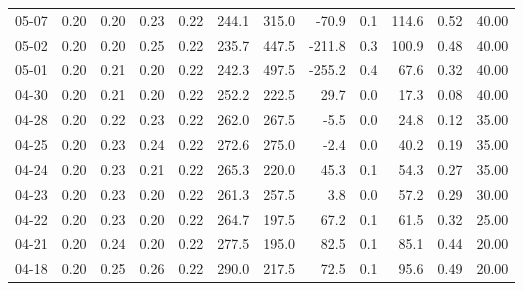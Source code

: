 \begin{threeparttable}
{\begin{tabular}{lrrrrrrrrrrr}
  05-07 &          0.20 &          0.20 &          0.23 &        0.22 &               244.1 &               315.0 &      -70.9 &                 0.1 &            114.6 &            0.52 &                  40.00 \\
  05-02 &          0.20 &          0.20 &          0.25 &        0.22 &               235.7 &               447.5 &     -211.8 &                 0.3 &            100.9 &            0.48 &                  40.00 \\
  05-01 &          0.20 &          0.21 &          0.20 &        0.22 &               242.3 &               497.5 &     -255.2 &                 0.4 &             67.6 &            0.32 &                  40.00 \\
  04-30 &          0.20 &          0.21 &          0.20 &        0.22 &               252.2 &               222.5 &       29.7 &                 0.0 &             17.3 &            0.08 &                  40.00 \\
  04-28 &          0.20 &          0.22 &          0.23 &        0.22 &               262.0 &               267.5 &       -5.5 &                 0.0 &             24.8 &            0.12 &                  35.00 \\
  04-25 &          0.20 &          0.23 &          0.24 &        0.22 &               272.6 &               275.0 &       -2.4 &                 0.0 &             40.2 &            0.19 &                  35.00 \\
  04-24 &          0.20 &          0.23 &          0.21 &        0.22 &               265.3 &               220.0 &       45.3 &                 0.1 &             54.3 &            0.27 &                  35.00 \\
  04-23 &          0.20 &          0.23 &          0.20 &        0.22 &               261.3 &               257.5 &        3.8 &                 0.0 &             57.2 &            0.29 &                  30.00 \\
  04-22 &          0.20 &          0.23 &          0.20 &        0.22 &               264.7 &               197.5 &       67.2 &                 0.1 &             61.5 &            0.32 &                  25.00 \\
  04-21 &          0.20 &          0.24 &          0.20 &        0.22 &               277.5 &               195.0 &       82.5 &                 0.1 &             85.1 &            0.44 &                  20.00 \\
  04-18 &          0.20 &          0.25 &          0.26 &        0.22 &               290.0 &               217.5 &       72.5 &                 0.1 &             95.6 &            0.49 &                  20.00 \\

\end{tabular}}
\end{threeparttable}
